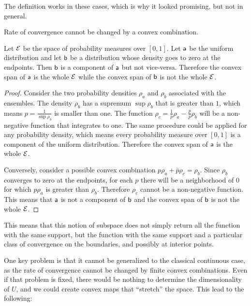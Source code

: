 The definition works in these cases, which is why it looked promising, but not in general.

\begin{insight}
	Rate of convergence cannot be changed by a convex combination.
\end{insight}

\begin{prop}
	Let $\Ens$ be the space of probability measures over $[0,1]$. Let $\ens[a]$ be the uniform distribution and let $\ens[b]$ be a distribution whose density goes to zero at the endpoints. Then $\ens[b]$ is a component of $\ens[a]$ but not vice-versa. Therefore the convex span of $\ens[a]$ is the whole $\Ens$ while the convex span of $\ens[b]$ is not the whole $\Ens$.
\end{prop}

\begin{proof}
	Consider the two probability densities $\rho_a$ and $\rho_b$ associated with the ensembles. The density $\rho_b$ has a supremum $\sup \rho_b$ that is greater than $1$, which means $p = \frac{1}{\sup \rho_b}$ is smaller than one. The function $\rho_c = \frac{1}{\bar{p}} \rho_a - \frac{p}{\bar{p}}\rho_b$ will be a non-negative function that integrates to one. The same procedure could be applied for any probability density, which means every probability measure over $[0,1]$ is a component of the uniform distribution. Therefore the convex span of $\ens[a]$ is the whole $\Ens$.
	
	Conversely, consider a possible convex combination $p \rho_a + \bar{p} \rho_c = \rho_b$. Since $\rho_b$ converges to zero at the endpoints, for each $p$ there will be a neighborhood of $0$ for which $p\rho_a$ is greater than $\rho_b$. Therefore $\rho_c$ cannot be a non-negative function. This means that $\ens[a]$ is not a component of $\ens[b]$ and the convex span of $\ens[b]$ is not the whole $\Ens$.
\end{proof}

This means that this notion of subspace does not simply return all the function with the same support, but the function with the same support and a particular class of convergence on the boundaries, and possibly at interior points.

One key problem is that it cannot be generalized to the classical continuous case, as the rate of convergence cannot be changed by finite convex combinations. Even if that problem is fixed, there would be nothing to determine the dimensionality of $U$, and we could create convex maps that ``stretch'' the space. This lead to the following:

